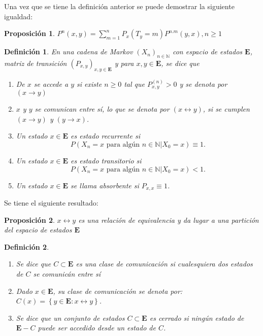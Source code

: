 \documentclass{article}
\newtheorem{Def}{Definición}
\newtheorem{Prop}{Proposición}
\newcommand{\nat}{\mathbb{N}}
\newcommand{\Eb}{\mathbf{E}}
\begin{document}
Una vez que se tiene la definición anterior se puede demostrar la siguiente igualdad:

\begin{Prop}
$P^{n}\left(x,y\right)=\sum_{m=1}^{n}P_{x}\left(T_{y}=m\right)P^{n.m}\left(y,x\right), n\geq1$
\end{Prop}

\begin{Def}
En una cadena de Markov $\left(X_{n}\right)_{n\in\nat}$ con espacio de estados $\Eb$, matriz de transición $\left(P_{x,y}\right)_{x,y\in\Eb}$ y para $x,y\in\Eb$,  se dice que
\begin{enumerate}
\item  De $x$ se accede a $y$ si existe $n\geq0$ tal que $P_{x,y}^{(n)}>0$ y se denota por $\left(x\rightarrow y\right)$

\item $x$ y $y$ se comunican entre sí, lo que se denota por $\left(x\leftrightarrow y\right)$, si se cumplen $\left(x\rightarrow y\right)$ y $\left(y\rightarrow x\right)$.

\item Un estado $x\in\Eb$ es estado recurrente si $$P\left(X_{n}=x\textrm{ para algún }n\in\nat|X_{0}=x \right)\equiv1.$$ 

\item Un estado $x\in\Eb$ es estado transitorio si $$P\left(X_{n}=x\textrm{ para algún }n\in\nat|X_{0}=x \right)<1.$$ 

\item Un estado $x\in\Eb$ se llama absorbente si $P_{x,x}\equiv1$.
\end{enumerate}
\end{Def}


Se tiene el siguiente resultado:

\begin{Prop}
$x\leftrightarrow y$ es una relación de equivalencia y da lugar a una partición del espacio de estados $\Eb$
\end{Prop}


\begin{Def}
\begin{enumerate}
\item[1.  ] Se dice que $C\subset \Eb$ es una clase de comunicación si cualesquiera dos estados de $C$ se comunicán entre sí

\item[2.  ] Dado $x\in\Eb$, su clase de comunicación se denota por: $C\left(x\right)=\left\{y\in\Eb:x\leftrightarrow y\right\}$.

\item[3.  ] Se dice que un conjunto de estados  $C\subset \Eb$ es cerrado si ningún estado de $\Eb-C$ puede ser accedido desde un estado de $C$.
\end{enumerate}
\end{Def}
\end{document}
